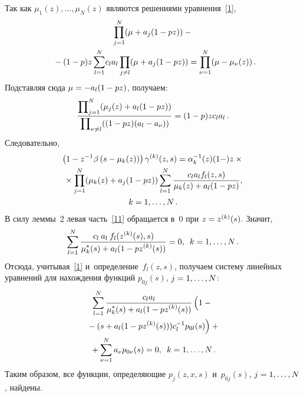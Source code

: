 \begin{multicols}{2}
Так как $\mu_1(z),\ldots,\mu_N(z)$ являются решениями уравнения~\eqref{1},
\begin{multline*}
\prod\limits_{j=1}^N(\mu+a_j(1-pz))-{}\\
{}-(1-p)z\sum\limits_{l=1}^N\!
c_la_l\prod\limits_{j\ne l}(\mu+a_j(1-pz))=
\prod\limits_{\nu=1}^N(\mu-\mu_{\nu}(z))\,.\hspace*{-3.1708pt}
\end{multline*}
Подставляя сюда $\mu\hm=-a_l(1\hm-pz)$, получаем:
$$
\displaystyle\frac{\displaystyle \prod\nolimits_{j=1}^N(\mu_j(z)+a_l(1-pz))\mathstrut}{\displaystyle \prod\nolimits_{\nu\ne l}((1-pz)
(a_l-a_{\nu}))\mathstrut}=(1-p)zc_la_l\,.
$$
Следовательно,
\begin{multline}
\label{11}
\left(1-z^{-1}\beta\left(s-\mu_k(z)\right)\right)\gamma^{(k)}(z,s)=
\alpha_k^{-1}(z)(1-)z\times{}\\
{}
\times\prod\limits_{j=1}^N(\mu_k(z)+a_j(1-pz))\sum\limits_{l=1}^N
\displaystyle\frac{\displaystyle c_la_lf_l(z,s)\mathstrut}{\displaystyle \mu_k(z)+a_l(1-pz)\mathstrut},\\ k=1,\ldots,N\,.
\end{multline}
В силу леммы~2 левая часть~\eqref{11} обращается в~0 при $z\hm=z^{(k)}(s).$ Значит,
$$
\sum\limits_{l=1}^N \displaystyle\frac{\displaystyle c_l\:a_l\:f_l(z^{(k)}(s),s)\mathstrut}{\displaystyle \mu^{\ast}_k(s)+a_l
(1-pz^{(k)}(s))\mathstrut}=0,\enskip k=1,\ldots,N\,.
$$
Отсюда, учитывая~\eqref{1} и~определение~$f_l(z,s)$, 
получаем систему линейных уравнений для нахождения функций $p_{0j}(s)$, 
$j\hm=1,\ldots,N$:
\begin{multline*}
\sum\limits_{l=1}^N \fr{c_l a_l}{\mu^{\ast}_k(s)+a_l(1-pz^{(k)}(s))}
\left(
\vphantom{(s+a_l(1-pz^{(k)}(s)))c_l^{-1} p_{0l}(s)}
1-{}\right.\\
\left.{}-(s+a_l(1-pz^{(k)}(s)))c_l^{-1} p_{0l}(s)\right)+{}
\\
{}+\sum\limits_{\nu=1}^Na_{\nu}p_{0\nu}(s)=0,\enskip k=1,\ldots,N\,.
\end{multline*}
Таким образом, все функции, определяющие $p_j(z,x,s)$ и~$p_{0j}(s)$, 
$j\hm=1,\ldots,N$, найдены.



\end{multicols}
